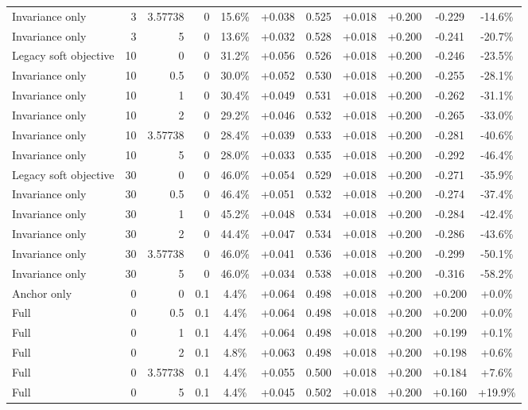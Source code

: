 \begin{table}[htbp]
\begin{tabular}{lrrrccccccc}
Invariance only & 3 & 3.57738 & 0 & 15.6\% & +0.038 & 0.525 & +0.018 & +0.200 & -0.229 & -14.6\% \\
Invariance only & 3 & 5 & 0 & 13.6\% & +0.032 & 0.528 & +0.018 & +0.200 & -0.241 & -20.7\% \\
Legacy soft objective & 10 & 0 & 0 & 31.2\% & +0.056 & 0.526 & +0.018 & +0.200 & -0.246 & -23.5\% \\
Invariance only & 10 & 0.5 & 0 & 30.0\% & +0.052 & 0.530 & +0.018 & +0.200 & -0.255 & -28.1\% \\
Invariance only & 10 & 1 & 0 & 30.4\% & +0.049 & 0.531 & +0.018 & +0.200 & -0.262 & -31.1\% \\
Invariance only & 10 & 2 & 0 & 29.2\% & +0.046 & 0.532 & +0.018 & +0.200 & -0.265 & -33.0\% \\
Invariance only & 10 & 3.57738 & 0 & 28.4\% & +0.039 & 0.533 & +0.018 & +0.200 & -0.281 & -40.6\% \\
Invariance only & 10 & 5 & 0 & 28.0\% & +0.033 & 0.535 & +0.018 & +0.200 & -0.292 & -46.4\% \\
Legacy soft objective & 30 & 0 & 0 & 46.0\% & +0.054 & 0.529 & +0.018 & +0.200 & -0.271 & -35.9\% \\
Invariance only & 30 & 0.5 & 0 & 46.4\% & +0.051 & 0.532 & +0.018 & +0.200 & -0.274 & -37.4\% \\
Invariance only & 30 & 1 & 0 & 45.2\% & +0.048 & 0.534 & +0.018 & +0.200 & -0.284 & -42.4\% \\
Invariance only & 30 & 2 & 0 & 44.4\% & +0.047 & 0.534 & +0.018 & +0.200 & -0.286 & -43.6\% \\
Invariance only & 30 & 3.57738 & 0 & 46.0\% & +0.041 & 0.536 & +0.018 & +0.200 & -0.299 & -50.1\% \\
Invariance only & 30 & 5 & 0 & 46.0\% & +0.034 & 0.538 & +0.018 & +0.200 & -0.316 & -58.2\% \\
Anchor only & 0 & 0 & 0.1 & 4.4\% & +0.064 & 0.498 & +0.018 & +0.200 & +0.200 & +0.0\% \\
Full & 0 & 0.5 & 0.1 & 4.4\% & +0.064 & 0.498 & +0.018 & +0.200 & +0.200 & +0.0\% \\
Full & 0 & 1 & 0.1 & 4.4\% & +0.064 & 0.498 & +0.018 & +0.200 & +0.199 & +0.1\% \\
Full & 0 & 2 & 0.1 & 4.8\% & +0.063 & 0.498 & +0.018 & +0.200 & +0.198 & +0.6\% \\
Full & 0 & 3.57738 & 0.1 & 4.4\% & +0.055 & 0.500 & +0.018 & +0.200 & +0.184 & +7.6\% \\
Full & 0 & 5 & 0.1 & 4.4\% & +0.045 & 0.502 & +0.018 & +0.200 & +0.160 & +19.9\% \\

\end{tabular}
\end{table}
